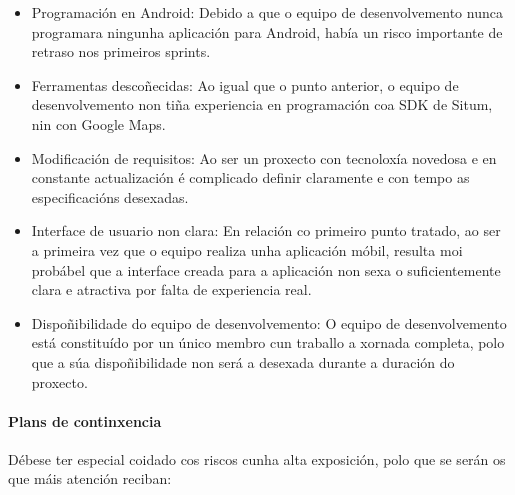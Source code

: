 \begin{itemize}
	\item Programación en Android: Debido a que o equipo de desenvolvemento nunca programara ningunha aplicación para Android, había un risco importante de retraso nos primeiros sprints.
	\item Ferramentas descoñecidas: Ao igual que o punto anterior, o equipo de desenvolvemento non tiña experiencia en programación coa SDK de Situm, nin con Google Maps.
	\item Modificación de requisitos: Ao ser un proxecto con tecnoloxía novedosa e en constante actualización é complicado definir claramente e con tempo as especificacións desexadas.
	\item Interface de usuario non clara: En relación co primeiro punto tratado, ao ser a primeira vez que o equipo realiza unha aplicación móbil, resulta moi probábel que a interface creada para a aplicación non sexa o suficientemente clara e atractiva por falta de experiencia real.
	\item Dispoñibilidade do equipo de desenvolvemento: O equipo de desenvolvemento está constituído por un único membro cun traballo a xornada completa, polo que a súa dispoñibilidade non será a desexada durante a duración do proxecto.
\end{itemize}

\paragraph{Plans de continxencia}
Débese ter especial coidado cos riscos cunha alta exposición, polo que se serán os que máis atención reciban:


